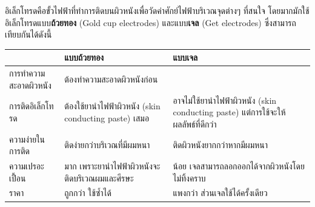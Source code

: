 อิเล็กโทรดคือขั้วไฟฟ้าที่ทำการติดบนผิวหนังเพื่อวัดค่าศักย์ไฟฟ้าบริเวณจุดต่างๆ ที่สนใจ โดยมากมักใช้อิเล็กโทรดแบบ\textbf{ถ้วยทอง}
(Gold cup electrodes) และแบบ\textbf{เจล} (Get electrodes) ซึ่งสามารถเทียบกันได้ดังนี้

\begin{table}[h]
    \begin{tabularx}{\textwidth}{l|X|X}
                          & แบบถ้วยทอง                                           & แบบเจล                                                                           \\
                          \hline
    การทำความสะอาดผิวหนัง & \multicolumn{2}{l}{ต้องทำความสะอาดผิวหนังก่อน}                                                                                          \\
                          \hline
    การติดอิเล็กโทรด      & ต้องใช้ยานำไฟฟ้าผิวหนัง (skin conducting paste) เสมอ & อาจไม่ใช้ยานำไฟฟ้าผิวหนัง (skin conducting paste) แต่การใช้จะให้ผลลัพธ์ที่ดีกว่า \\
                          \hline
    ความง่ายในการติด      & ติดง่ายกว่าบริเวณที่มีผมหนา                          & ติดผิวหนังยากกว่าหากมีผมหนา                                                      \\
                          \hline
    ความเปรอะเปื้อน       & มาก เพราะยานำไฟฟ้าผิวหนังจะติดบริเวณผมและศีรษะ       & น้อย เจลสามารถลอกออกได้จากผิวหนังโดยไม่ทิ้งคราบ                                  \\
                          \hline
    ราคา                  & ถูกกว่า ใช้ซ้ำได้                                    & แพงกว่า ส่วนเจลใช้ได้ครั้งเดียว                                                 
    \end{tabularx}
\end{table}
